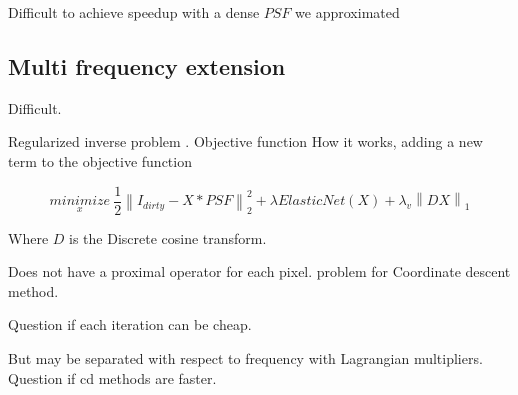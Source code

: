Difficult to achieve speedup with a dense $PSF$ we approximated












\subsection{Multi frequency extension}\label{discussion:mfs}
Difficult.

Regularized inverse problem  \cite{ferrari2015multi}. Objective function 
How it works, adding a new term to the objective function

\begin{equation}\label{cd:deconv}
\underset{x}{minimize} \: \frac{1}{2} \left \| I_{dirty} - X * PSF \right \|_2^2 + \lambda ElasticNet(X) + \lambda_v \left \| DX \right \|_1
\end{equation}

Where $D$ is the Discrete cosine transform.

Does not have a proximal operator for each pixel. problem for Coordinate descent method.

Question if each iteration can be cheap.

But may be separated with respect to frequency with Lagrangian multipliers. Question if cd methods are faster.
